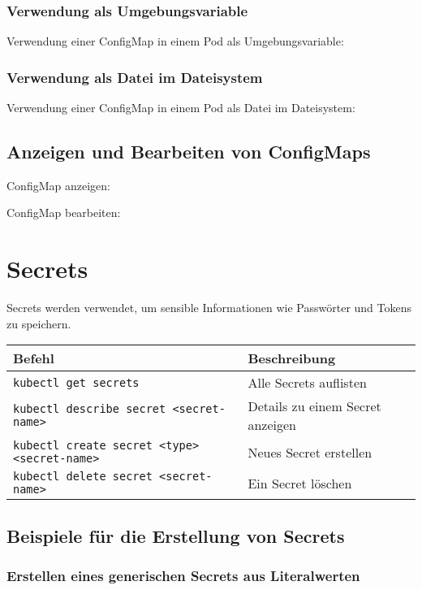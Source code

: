 \subsubsection{Verwendung als Umgebungsvariable}
Verwendung einer ConfigMap in einem Pod als Umgebungsvariable:

\subsubsection{Verwendung als Datei im Dateisystem}
Verwendung einer ConfigMap in einem Pod als Datei im Dateisystem:


\subsection{Anzeigen und Bearbeiten von ConfigMaps}
ConfigMap anzeigen:

\noindent
ConfigMap bearbeiten:

\section{Secrets}
Secrets werden verwendet, um sensible Informationen wie Passwörter und Tokens zu speichern.\\

\noindent
\begin{tabularx}{\textwidth}{|p{}|X|}
\hline
\textbf{Befehl} & \textbf{Beschreibung} \\
\hline
\texttt{kubectl get secrets} & Alle Secrets auflisten \\
\texttt{kubectl describe secret <secret-name>} & Details zu einem Secret anzeigen \\
\texttt{kubectl create secret <type> <secret-name>} & Neues Secret erstellen \\
\texttt{kubectl delete secret <secret-name>} & Ein Secret löschen \\
\hline
\end{tabularx}

\subsection{Beispiele für die Erstellung von Secrets}

\subsubsection{Erstellen eines generischen Secrets aus Literalwerten}

